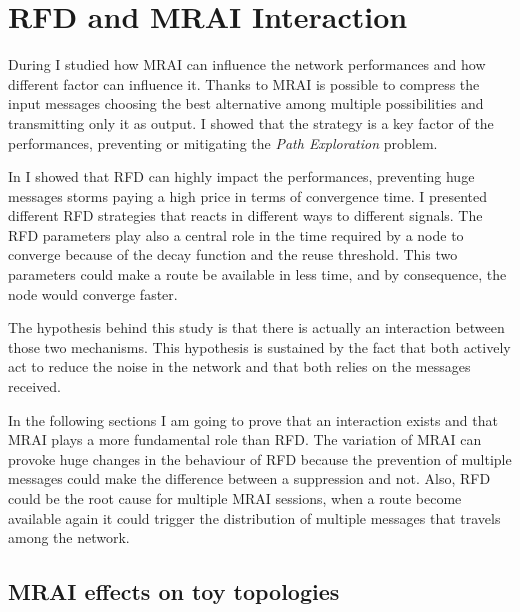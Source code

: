 \chapter{RFD and MRAI Interaction}
\label{cha:bgp_rfd_vs_mrai}

During  I studied how \ac{MRAI} can influence
the network performances and how different factor can influence it.
Thanks to \ac{MRAI} is possible to compress the input messages choosing the best
alternative among multiple possibilities and transmitting only it as output.
I showed that the strategy is a key factor of the performances, preventing or
mitigating the \textit{Path Exploration} problem.

In  I showed that \ac{RFD} can highly impact the performances,
preventing huge messages storms paying a high price in terms of convergence time.
I presented different \ac{RFD} strategies that reacts in different ways to
different signals.
The \ac{RFD} parameters play also a central role in the time required by a node
to converge because of the decay function and the reuse threshold.
This two parameters could make a route be available in less time, and by consequence,
the node would converge faster.

The hypothesis behind this study is that there is actually an interaction between
those two mechanisms.
This hypothesis is sustained by the fact that both actively act to reduce the
noise in the network and that both relies on the messages received.

In the following sections I am going to prove that an interaction exists and that \ac{MRAI}
plays a more fundamental role than \ac{RFD}.
The variation of \ac{MRAI} can provoke huge changes in the behaviour of \ac{RFD}
because the prevention of multiple messages could make the difference between
a suppression and not.
Also, \ac{RFD} could be the root cause for multiple \ac{MRAI} sessions, when
a route become available again it could trigger the distribution of multiple
messages that travels among the network.

\section{MRAI effects on toy topologies}
\label{sec:bgp_rfd_toy}

%

